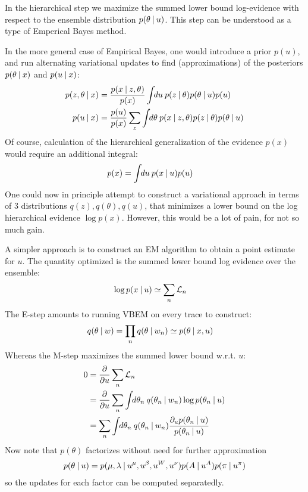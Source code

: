 In the hierarchical step we maximize the summed lower bound log-evidence with respect to the ensemble distribution $p(\theta \:|\: u)$. This step can be understood as a type of Emperical Bayes method. 

In the more general case of Empirical Bayes, one would introduce a prior $p(u)$, and run alternating variational updates to find (approximations) of the posteriors $p(\theta \:|\: x)$ and $p(u \:|\: x)$:
\begin{align}
  p(z,\theta \:|\: x)
  &=
  \frac{p(x \:|\: z,\theta)}{p(x)} \int \!\!du \: p(z \:|\: \theta)p(\theta \:|\: u) p(u) \\
  p(u \:|\: x)
  &=
  \frac{p(u)}{p(x)} \sum_z \int \!\!d\theta \: p(x \:|\: z, \theta) p(z \:|\: \theta) p(\theta \:|\: u)
\end{align}
Of course, calculation of the hierarchical generalization of the evidence $p(x)$ would require an additional integral:
\begin{align}
  p(x)
  &=
  \int \!\!du \: p(x \:|\: u) p(u)
\end{align}
One could now in principle attempt to construct a variational approach in terms of 3 distributions $q(z), q(\theta), q(u)$, that minimizes a lower bound on the log hierarchical evidence $\log p(x)$. However, this would be a lot of pain, for not so much gain.

A simpler approach is to construct an EM algorithm to obtain a point estimate for $u$. The quantity optimized is the summed lower bound log evidence over the ensemble:
\begin{align}
  \log p(x \:|\: u) &\simeq \sum_n \mathcal{L}_n
\end{align}
The E-step amounts to running VBEM on every trace to construct:
\begin{align}
 q(\theta \:|\: w) &= \prod_n q(\theta \:|\: w_n) \simeq p(\theta \:|\: x, u)
\end{align}
Whereas the M-step maximizes the summed lower bound w.r.t. $u$:
\begin{align}
  0 &= \frac{\partial }{\partial u} \sum_n \mathcal{L}_n \\
    &= \frac{\partial }{\partial u} \sum_n \int \!\!d\theta_n \: q(\theta_n \:|\: w_n) \log p(\theta_n \:|\: u) \\
    &= \sum_n \int \!\!d\theta_n \: 
        q(\theta_n \:|\: w_n) \frac{\partial_u p(\theta_n \:|\: u)}{p(\theta_n \:|\: u)}
       \label{eq:u_maximization}
\end{align}
Now note that $p(\theta)$ factorizes without need for further approximation
\begin{align}
 p(\theta \:|\: u) = p(\mu,\lambda \:|\: u^\mu, u^\beta, u^W, u^\nu) p(A \:|\: u^A) p(\pi \:|\: u^\pi)
\end{align}
so the updates for each factor can be computed separatedly. 

